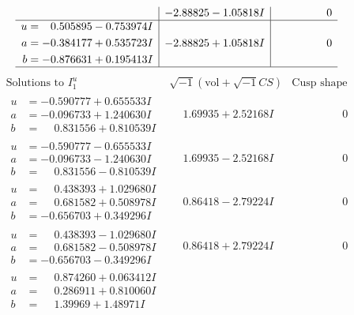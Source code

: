 \documentclass[1p]{elsarticle_modified}
\theoremstyle{definition}
\newcommand{\I}{\sqrt{-1}}
\begin{document}
$$\begin{array}{c|c|c}
 & -2.88825 - 1.05818 I & \phantom{-0.000000 } 0 \\ \hline\begin{aligned}
u &= \phantom{-}0.505895 - 0.753974 I \\
a &= -0.384177 + 0.535723 I \\
b &= -0.876631 + 0.195413 I\end{aligned}
 & -2.88825 + 1.05818 I & \phantom{-0.000000 } 0\\
 \hline 
 \end{array}$$\newpage$$\begin{array}{c|c|c}  
\text{Solutions to }I^u_{1}& \I (\text{vol} + \sqrt{-1}CS) & \text{Cusp shape}\\
 \hline 
\begin{aligned}
u &= -0.590777 + 0.655533 I \\
a &= -0.096733 + 1.240630 I \\
b &= \phantom{-}0.831556 + 0.810539 I\end{aligned}
 & \phantom{-}1.69935 + 2.52168 I & \phantom{-0.000000 } 0 \\ \hline\begin{aligned}
u &= -0.590777 - 0.655533 I \\
a &= -0.096733 - 1.240630 I \\
b &= \phantom{-}0.831556 - 0.810539 I\end{aligned}
 & \phantom{-}1.69935 - 2.52168 I & \phantom{-0.000000 } 0 \\ \hline\begin{aligned}
u &= \phantom{-}0.438393 + 1.029680 I \\
a &= \phantom{-}0.681582 + 0.508978 I \\
b &= -0.656703 + 0.349296 I\end{aligned}
 & \phantom{-}0.86418 - 2.79224 I & \phantom{-0.000000 } 0 \\ \hline\begin{aligned}
u &= \phantom{-}0.438393 - 1.029680 I \\
a &= \phantom{-}0.681582 - 0.508978 I \\
b &= -0.656703 - 0.349296 I\end{aligned}
 & \phantom{-}0.86418 + 2.79224 I & \phantom{-0.000000 } 0 \\ \hline\begin{aligned}
u &= \phantom{-}0.874260 + 0.063412 I \\
a &= \phantom{-}0.286911 + 0.810060 I \\
b &= \phantom{-}1.39969 + 1.48971 I\end{aligned}

\end{array}$$
\end{document}

